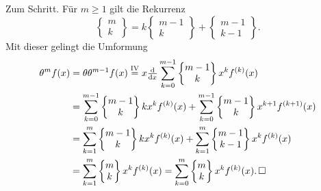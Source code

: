 \begin{Beweis}
Zum Schritt. Für $m\ge 1$ gilt die Rekurrenz
\[\begin{Bmatrix}m\\ k\end{Bmatrix} = k\begin{Bmatrix}m-1\\ k\end{Bmatrix} + \begin{Bmatrix}m-1\\ k-1\end{Bmatrix}.\]
Mit dieser gelingt die Umformung
\begin{align*}
\theta^m f(x) &= \theta \theta^{m-1} f(x) \stackrel{\mathrm{IV}}=
x\tfrac{\mathrm d}{\mathrm dx}\sum_{k=0}^{m-1}\begin{Bmatrix}m-1\\ k\end{Bmatrix}x^k f^{(k)}(x)\\
&= \sum_{k=0}^{m-1}\begin{Bmatrix}{m-1}\\ k\end{Bmatrix}kx^k f^{(k)}(x)
+ \sum_{k=0}^{m-1}\begin{Bmatrix}m-1\\ k\end{Bmatrix}x^{k+1} f^{(k+1)}(x)\\
&= \sum_{k=1}^m\begin{Bmatrix}{m-1}\\ k\end{Bmatrix}kx^k f^{(k)}(x)
+ \sum_{k=1}^m\begin{Bmatrix}m-1\\ k-1\end{Bmatrix}x^k f^{(k)}(x)\\
&= \sum_{k=1}^m\begin{Bmatrix}m\\ k\end{Bmatrix}x^k f^{(k)}(x)
= \sum_{k=0}^m\begin{Bmatrix}m\\ k\end{Bmatrix}x^k f^{(k)}(x).\,\square
\end{align*}
\end{Beweis}

